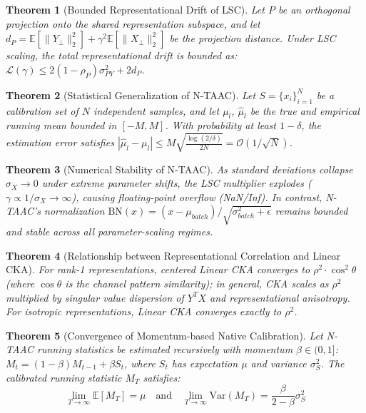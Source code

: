 \documentclass{article}
\theoremstyle{plain}
\newtheorem{theorem}{Theorem}[section]
\theoremstyle{definition}
\theoremstyle{remark}
\begin{document}
\begin{theorem}[Bounded Representational Drift of LSC]\label{thm:lsc_drift_bound}
Let $P$ be an orthogonal projection onto the shared representation subspace, and let $d_P = \mathbb{E}[\|Y_\perp\|_2^2] + \gamma^2 \mathbb{E}[\|X_\perp\|_2^2]$ be the projection distance. Under LSC scaling, the total representational drift is bounded as: $\mathcal{L}(\gamma) \le 2(1 - \rho_P)\sigma_{PY}^2 + 2 d_P$.
\end{theorem}

\begin{theorem}[Statistical Generalization of N-TAAC]\label{thm:ntaac_generalization}
Let $S = \{x_i\}_{i=1}^N$ be a calibration set of $N$ independent samples, and let $\mu_l$, $\hat{\mu}_l$ be the true and empirical running mean bounded in $[-M, M]$. With probability at least $1 - \delta$, the estimation error satisfies $| \hat{\mu}_l - \mu_l | \le M \sqrt{\frac{\log(2/\delta)}{2N}} = \mathcal{O}(1/\sqrt{N})$.
\end{theorem}

\begin{theorem}[Numerical Stability of N-TAAC]\label{thm:numerical_stability}
As standard deviations collapse $\sigma_X \to 0$ under extreme parameter shifts, the LSC multiplier explodes ($\gamma \propto 1/\sigma_X \to \infty$), causing floating-point overflow (NaN/Inf). In contrast, N-TAAC's normalization $\text{BN}(x) = (x - \mu_{batch}) / \sqrt{\sigma_{batch}^2 + \epsilon}$ remains bounded and stable across all parameter-scaling regimes.
\end{theorem}

\begin{theorem}[Relationship between Representational Correlation and Linear CKA]\label{thm:rho_cka_relationship}
For rank-1 representations, centered Linear CKA converges to $\rho^2 \cdot \cos^2 \theta$ (where $\cos \theta$ is the channel pattern similarity); in general, CKA scales as $\rho^2$ multiplied by singular value dispersion of $Y^T X$ and representational anisotropy. For isotropic representations, Linear CKA converges exactly to $\rho^2$.
\end{theorem}

\begin{theorem}[Convergence of Momentum-based Native Calibration]\label{thm:momentum_convergence}
Let N-TAAC running statistics be estimated recursively with momentum $\beta \in (0, 1]$: $M_t = (1 - \beta) M_{t-1} + \beta S_t$, where $S_t$ has expectation $\mu$ and variance $\sigma_S^2$. The calibrated running statistic $M_T$ satisfies:
$$\lim_{T \to \infty} \mathbb{E}[M_T] = \mu \quad \text{and} \quad \lim_{T \to \infty} \text{Var}(M_T) = \frac{\beta}{2 - \beta} \sigma_S^2$$
\end{theorem}
\end{document}
